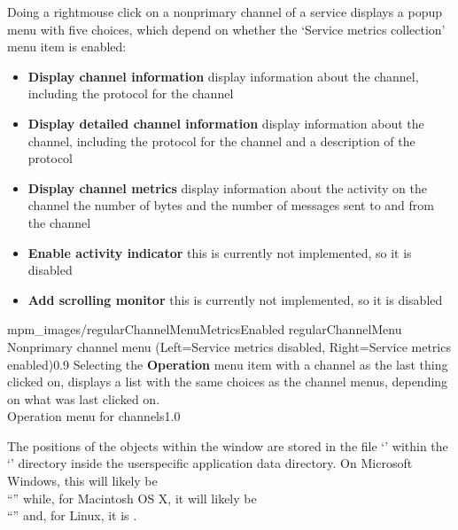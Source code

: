 Doing a right\longDash{}mouse click on a non\longDash{}primary channel of a service
displays a popup menu with five choices, which depend on whether the `Service metrics
collection' menu item is enabled:
\begin{itemize}
\item\textbf{Display channel information} display information about the channel,
including the protocol for the channel
\item\exSp\textbf{Display detailed channel information} display information about the
channel, including the protocol for the channel and a description of the protocol
\item\exSp\textbf{Display channel metrics} display information about the activity on the
channel \longDash{} the number of bytes and the number of messages sent to and from the
channel
\item\exSp\textbf{Enable activity indicator} \longDash{} this is currently not
implemented, so it is disabled
\item\exSp\textbf{Add scrolling monitor} \longDash{} this is currently not implemented, so
it is disabled
\end{itemize}
%
{mpm_images/regularChannelMenuMetricsEnabled}%
{regularChannelMenu}%
{Non\longDash{}primary channel menu (Left=Service metrics disabled, Right=Service metrics
enabled)}{0.9}
\clearpage
Selecting the \textbf{Operation} menu item with a channel as the last thing clicked on,
displays a list with the same choices as the channel menus, depending on what was last
clicked on.\\
%
{Operation menu for channels}{1.0}

The positions of the objects within the window are stored in the file
`' within the `' directory inside the
user\longDash{}specific application data directory.
On Microsoft Windows, this will likely be\\
``'' while, for Macintosh OS X, it will likely be\\
``'' and, for Linux, it is \TBD.\\
\primaryEnd{}
\TBD
\primaryEnd{}